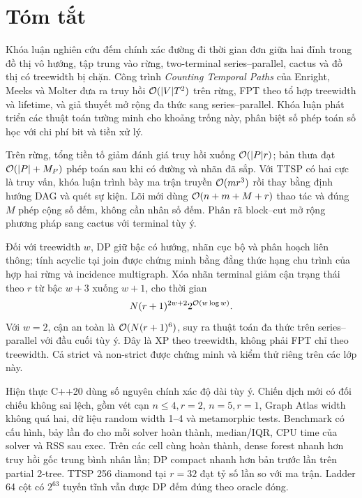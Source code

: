 \chapter*{Tóm tắt}

Khóa luận nghiên cứu đếm chính xác đường đi thời gian đơn giữa hai đỉnh trong đồ thị vô hướng, tập trung vào rừng, two-terminal series--parallel, cactus và đồ thị có treewidth bị chặn. Công trình \emph{Counting Temporal Paths} của Enright, Meeks và Molter đưa ra truy hồi $\mathcal{O}(|V|T^2)$ trên rừng, FPT theo tổ hợp treewidth và lifetime, và giả thuyết mở rộng đa thức sang series--parallel. Khóa luận phát triển các thuật toán tường minh cho khoảng trống này, phân biệt số phép toán số học với chi phí bit và tiền xử lý.

Trên rừng, tổng tiền tố giảm đánh giá truy hồi xuống $\mathcal{O}(|P|r)$; bản thưa đạt $\mathcal{O}(|P|+M_P)$ phép toán sau khi có đường và nhãn đã sắp. Với TTSP có hai cực là truy vấn, khóa luận trình bày ma trận truyền $\mathcal{O}(mr^3)$ rồi thay bằng định hướng DAG và quét sự kiện. Lõi mới dùng $\mathcal{O}(n+m+M+r)$ thao tác và đúng $M$ phép cộng số đếm, không cần nhân số đếm. Phân rã block--cut mở rộng phương pháp sang cactus với terminal tùy ý.

Đối với treewidth $w$, DP giữ bậc có hướng, nhãn cục bộ và phân hoạch liên thông; tính acyclic tại join được chứng minh bằng đẳng thức hạng chu trình của hợp hai rừng và incidence multigraph. Xóa nhãn terminal giảm cận trạng thái theo $r$ từ bậc $w+3$ xuống $w+1$, cho thời gian
\[
 N(r+1)^{2w+2}2^{\mathcal{O}(w\log w)}.
\]
Với $w=2$, cận an toàn là $\mathcal{O}(N(r+1)^6)$, suy ra thuật toán đa thức trên series--parallel với đầu cuối tùy ý. Đây là XP theo treewidth, không phải FPT chỉ theo treewidth. Cả strict và non-strict được chứng minh và kiểm thử riêng trên các lớp này.

Hiện thực C++20 dùng số nguyên chính xác độ dài tùy ý. Chiến dịch mới có \AuditComparisons{} đối chiếu không sai lệch, gồm vét cạn $n\le4,r=2$, $n=5,r=1$, \AtlasGraphs{} Graph Atlas width không quá hai, dữ liệu random width 1--4 và metamorphic tests. Benchmark có \BenchCases{} cấu hình, bảy lần đo cho mỗi solver hoàn thành, median/IQR, CPU time của solver và RSS sau exec. Trên các cell cùng hoàn thành, dense forest nhanh hơn truy hồi gốc trung bình nhân \ForestGeoSpeedup{} lần; DP compact nhanh hơn bản trước \DPGeoSpeedup{} lần trên partial 2-tree. TTSP 256 diamond tại $r=32$ đạt tỷ số \TTSPSpeedup{} lần so với ma trận. Ladder 64 cột có $2^{63}$ tuyến tĩnh vẫn được DP đếm đúng theo oracle đóng.

